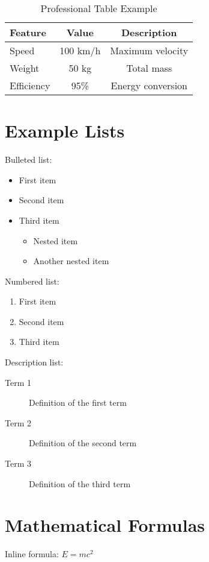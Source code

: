 \documentclass[12pt,a4paper,oneside]{book}
\begin{document}
\begin{table}[h]
\centering
\caption{Professional Table Example}
\label{tab:professional}
\begin{tabular}{lcc}
\toprule
Feature & Value & Description \\
\midrule
Speed & 100 km/h & Maximum velocity \\
Weight & 50 kg & Total mass \\
Efficiency & 95\% & Energy conversion \\
\bottomrule
\end{tabular}
\end{table}

\section{Example Lists}

Bulleted list:
\begin{itemize}
\item First item
\item Second item
\item Third item
    \begin{itemize}
    \item Nested item
    \item Another nested item
    \end{itemize}
\end{itemize}

Numbered list:
\begin{enumerate}
\item First item
\item Second item
\item Third item
\end{enumerate}

Description list:
\begin{description}
\item[Term 1] Definition of the first term
\item[Term 2] Definition of the second term
\item[Term 3] Definition of the third term
\end{description}

\section{Mathematical Formulas}

Inline formula: $E = mc^2$
\end{document}

